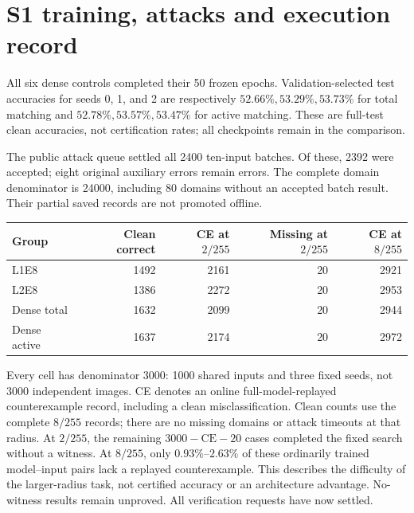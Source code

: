 
\clearpage

\section{S1 training, attacks and execution record}
\label{app:s1protocol}
All six dense controls completed their 50 frozen epochs. Validation-selected
test accuracies for seeds 0, 1, and 2 are respectively
$52.66\%,53.29\%,53.73\%$ for total matching and
$52.78\%,53.57\%,53.47\%$ for active matching. These are full-test clean
accuracies, not certification rates; all checkpoints remain in the comparison.

The public attack queue settled all 2400 ten-input batches. Of these, 2392
were accepted; eight original auxiliary errors remain errors.
The complete domain denominator is 24000, including 80 domains without an
accepted batch result. Their partial saved records are not promoted offline.

\begin{center}
\begin{tabular}{lrrrr}
\toprule
Group&Clean correct&CE at $2/255$&Missing at $2/255$&CE at $8/255$\\
\midrule
L1E8&1492&2161&20&2921\\
L2E8&1386&2272&20&2953\\
Dense total&1632&2099&20&2944\\
Dense active&1637&2174&20&2972\\
\bottomrule
\end{tabular}
\end{center}
Every cell has denominator 3000: 1000 shared inputs and three fixed seeds,
not 3000 independent images. CE denotes an online full-model-replayed
counterexample record, including a clean misclassification. Clean counts use
the complete $8/255$ records; there are no missing domains or attack timeouts
at that radius. At $2/255$, the remaining $3000-\mathrm{CE}-20$ cases completed
the fixed search without a witness.
At $8/255$, only $0.93\%$--$2.63\%$ of these ordinarily trained model--input
pairs lack a replayed counterexample. This describes the difficulty of the
larger-radius task, not certified accuracy or an architecture advantage.
No-witness results remain unproved. All verification requests have now settled.


